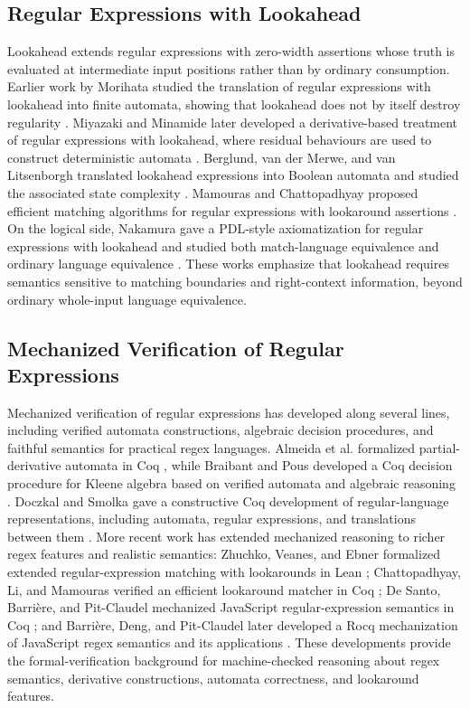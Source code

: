 \subsection{Regular Expressions with Lookahead}

Lookahead extends regular expressions with zero-width assertions whose
truth is evaluated at intermediate input positions rather than by
ordinary consumption. Earlier work by Morihata studied the translation
of regular expressions with lookahead into finite automata, showing that
lookahead does not by itself destroy regularity
\cite{morihata2012translation}. Miyazaki and Minamide later developed a
derivative-based treatment of regular expressions with lookahead, where
residual behaviours are used to construct deterministic automata
\cite{miyazaki2019derivatives}. Berglund, van der Merwe, and van
Litsenborgh translated lookahead expressions into Boolean automata and
studied the associated state complexity \cite{berglund2021lookahead}.
Mamouras and Chattopadhyay proposed efficient matching algorithms for
regular expressions with lookaround assertions
\cite{mamouras2024efficient}. On the logical side, Nakamura gave a
PDL-style axiomatization for regular expressions with lookahead and
studied both match-language equivalence and ordinary language
equivalence \cite{nakamura2026complete}. These works emphasize that
lookahead requires semantics sensitive to matching boundaries and
right-context information, beyond ordinary whole-input language
equivalence.

\subsection{Mechanized Verification of Regular Expressions}

Mechanized verification of regular expressions has developed along
several lines, including verified automata constructions, algebraic
decision procedures, and faithful semantics for practical regex
languages. Almeida et al. formalized partial-derivative automata in Coq
\cite{almeida2011partial}, while Braibant and Pous developed a Coq
decision procedure for Kleene algebra based on verified automata and
algebraic reasoning \cite{braibant2012}. Doczkal and Smolka gave a
constructive Coq development of regular-language representations,
including automata, regular expressions, and translations between them
\cite{doczkal2018regular}. More recent work has extended mechanized
reasoning to richer regex features and realistic semantics: Zhuchko,
Veanes, and Ebner formalized extended regular-expression matching with
lookarounds in Lean \cite{zhuchko2024}; Chattopadhyay, Li, and Mamouras
verified an efficient lookaround matcher in Coq
\cite{chattopadhyay2025verified}; De Santo, Barri{\`e}re, and
Pit-Claudel mechanized JavaScript regular-expression semantics in Coq
\cite{desanto2024}; and Barri{\`e}re, Deng, and Pit-Claudel later
developed a Rocq mechanization of JavaScript regex semantics and its
applications \cite{barriere2026}. These developments provide the
formal-verification background for machine-checked reasoning about
regex semantics, derivative constructions, automata correctness, and lookaround features.